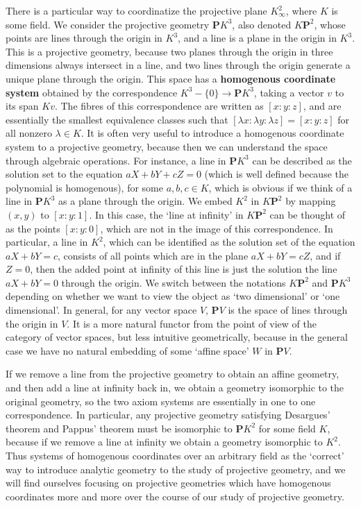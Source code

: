 \begin{example}
    There is a particular way to coordinatize the projective plane $K^2_\infty$, where $K$ is some field. We consider the projective geometry $\mathbf{P}K^3$, also denoted $K\mathbf{P}^2$, whose points are lines through the origin in $K^3$, and a line is a plane in the origin in $K^3$. This is a projective geometry, because two planes through the origin in three dimensions always intersect in a line, and two lines through the origin generate a unique plane through the origin. This space has a {\bf homogenous coordinate system} obtained by the correspondence $K^3 - \{ 0 \} \to \mathbf{P}K^3$, taking a vector $v$ to its span $Kv$. The fibres of this correspondence are written as $[x:y:z]$, and are essentially the smallest equivalence classes such that $[\lambda x: \lambda y: \lambda z] = [x:y:z]$ for all nonzero $\lambda \in K$. It is often very useful to introduce a homogenous coordinate system to a projective geometry, because then we can understand the space through algebraic operations. For instance, a line in $\mathbf{P}K^3$ can be described as the solution set to the equation $aX + bY + cZ = 0$ (which is well defined because the polynomial is homogenous), for some $a,b,c \in K$, which is obvious if we think of a line in $\mathbf{P}K^3$ as a plane through the origin. We embed $K^2$ in $K\mathbf{P}^2$ by mapping $(x,y)$ to $[x:y:1]$. In this case, the `line at infinity' in $K\mathbf{P}^2$ can be thought of as the points $[x:y:0]$, which are not in the image of this correspondence. In particular, a line in $K^2$, which can be identified as the solution set of the equation $aX + bY = c$, consists of all points which are in the plane $aX + bY = cZ$, and if $Z = 0$, then the added point at infinity of this line is just the solution the line $aX + bY = 0$ through the origin. We switch between the notations $K\mathbf{P}^2$ and $\mathbf{P}K^3$ depending on whether we want to view the object as `two dimensional' or `one dimensional'. In general, for any vector space $V$, $\mathbf{P}V$ is the space of lines through the origin in $V$. It is a more natural functor from the point of view of the category of vector spaces, but less intuitive geometrically, because in the general case we have no natural embedding of some `affine space' $W$ in $\mathbf{P}V$.
\end{example}

If we remove a line from the projective geometry to obtain an affine geometry, and then add a line at infinity back in, we obtain a geometry isomorphic to the original geometry, so the two axiom systems are essentially in one to one correspondence. In particular, any projective geometry satisfying Desargues' theorem and Pappus' theorem must be isomorphic to $\mathbf{P}K^2$ for some field $K$, because if we remove a line at infinity we obtain a geometry isomorphic to $K^2$. Thus systems of homogenous coordinates over an arbitrary field as the `correct' way to introduce analytic geometry to the study of projective geometry, and we will find ourselves focusing on projective geometries which have homogenous coordinates more and more over the course of our study of projective geometry.

